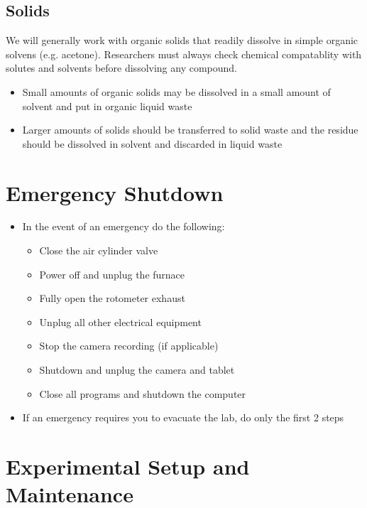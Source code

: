 \documentclass[letterpaper,11pt]{article}
\begin{document}
    \subsection{Solids} \label{sec:spill_solid}
    We will generally work with organic solids that readily dissolve in simple
    organic solvens (e.g. acetone). Researchers must always check chemical 
    compatablity with solutes and solvents before dissolving any compound.
    \begin{itemize}
    \item Small amounts of organic solids may be dissolved in a small amount of 
        solvent and put in organic liquid waste
    \item Larger amounts of solids should be transferred to solid waste and the
        residue should be dissolved in solvent and discarded in liquid waste
    \end{itemize}


\section{Emergency Shutdown} \label{sec:e_shtdn}

    \begin{itemize}
    \item In the event of an emergency do the following:
        
        \begin{itemize}
        \item Close the air cylinder valve
        \item Power off and unplug the furnace
        \item Fully open the rotometer exhaust
        \item Unplug all other electrical equipment
        \item Stop the camera recording (if applicable)
        \item Shutdown and unplug the camera and tablet
        \item Close all programs and shutdown the computer
        \end{itemize}
    
    \item If an emergency requires you to evacuate the lab, do only the first 
        2 steps
    \end{itemize}

\newpage	
\section{Experimental Setup and Maintenance}
\end{document}
